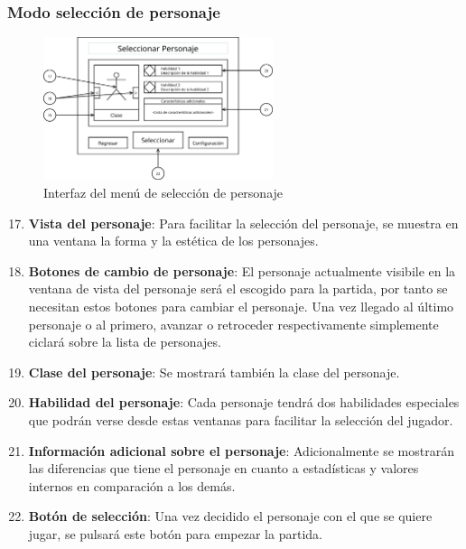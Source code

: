 \subsubsection{Modo selección de personaje}
\begin{figure}[H]
    \centering
    \includegraphics[width=0.6\textwidth]{5-Cuerpo/Chapter5/I5.png} %
    \caption{Interfaz del menú de selección de personaje}
    \label{fig:Interface_Seleccion_Personaje}
\end{figure}
\begin{enumerate}\setcounter{enumi}{16}
    \item \textbf{Vista del personaje}: Para facilitar la selección del
    personaje, se muestra en una ventana la forma y la estética de los
    personajes.
    \item \textbf{Botones de cambio de personaje}: El personaje actualmente
    visibile en la ventana de vista del personaje será el escogido para la
    partida, por tanto se necesitan estos botones para cambiar el personaje. Una
    vez llegado al último personaje o al primero, avanzar o retroceder
    respectivamente simplemente ciclará sobre la lista de personajes.
    \item \textbf{Clase del personaje}: Se mostrará también la clase del
    personaje.
    \item \textbf{Habilidad del personaje}: Cada personaje tendrá dos
    habilidades especiales que podrán verse desde estas ventanas para facilitar
    la selección del jugador.
    \item \textbf{Información adicional sobre el personaje}: Adicionalmente se
    mostrarán las diferencias que tiene el personaje en cuanto a estadísticas y
    valores internos en comparación a los demás.
    \item \textbf{Botón de selección}: Una vez decidido el personaje con el que
    se quiere jugar, se pulsará este botón para empezar la partida.
\end{enumerate}

